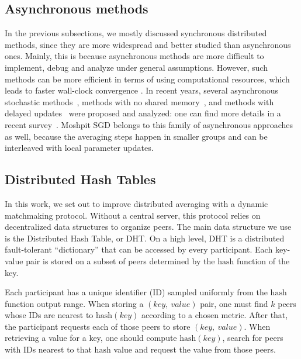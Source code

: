 \subsection{Asynchronous methods}
In the previous subsections, we mostly discussed synchronous distributed methods, since they are more widespread and better studied than asynchronous ones. Mainly, this is because asynchronous methods are more difficult to implement, debug and analyze under general assumptions. However, such methods can be more efficient in terms of using computational resources, which leads to faster wall-clock convergence \cite{assran2020advances}. In recent years, several asynchronous stochastic methods~\cite{recht2011hogwild,zhao2016fast,leblond2017asaga}, methods with no shared memory~\cite{peng2016arock,mishchenko2018delay}, and methods with delayed updates~\cite{agarwal2011distributed,feyzmahdavian2016asynchronous,arjevani2020tight,gorbunov2020linearly} were proposed and analyzed: one can find more details in a recent survey~\cite{assran2020advances}.
Moshpit SGD belongs to this family of asynchronous approaches as well, because the averaging steps happen in smaller groups and can be interleaved with local parameter updates.

\subsection{Distributed Hash Tables}
\label{sect:related_dht}

In this work, we set out to improve distributed averaging with a dynamic matchmaking protocol. Without a central server, this protocol relies on decentralized data structures to organize peers. The main data structure we use is the Distributed Hash Table, or DHT. On a high level, DHT is a distributed fault-tolerant ``dictionary'' that can be accessed by every participant. Each key-value pair is stored on a subset of peers determined by the $\mathrm{hash}$ function of the key.

Each participant has a unique identifier (ID) sampled uniformly from the $\mathrm{hash}$ function output range. When storing a $(key,\ value)$ pair, one must find $k$ peers whose IDs are nearest to $\mathrm{hash}(key)$ according to a chosen metric. After that, the participant requests each of those peers to store $(key,\ value)$. When retrieving a value for a key, one should compute $\mathrm{hash}(key)$, search for peers with IDs nearest to that $\mathrm{hash}$ value and request the value from those peers.

